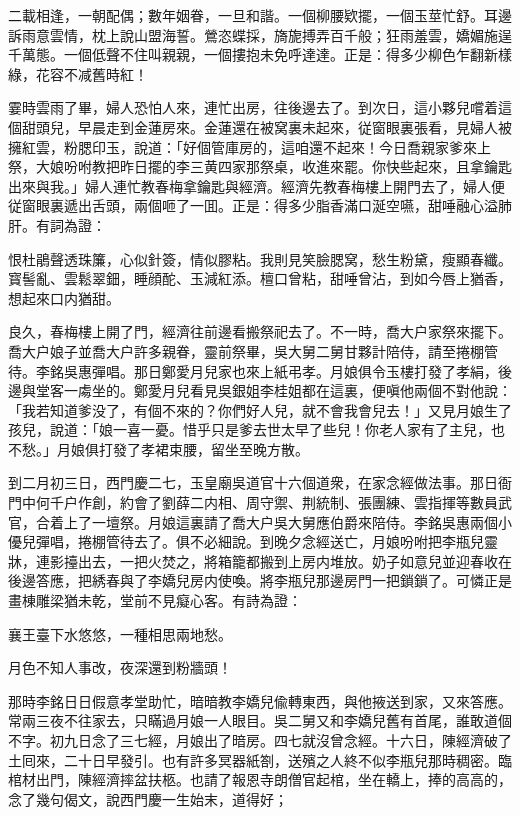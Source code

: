 \begin{myquote}
二載相逢，一朝配偶；數年姻眷，一旦和諧。一個柳腰欵擺，一個玉莖忙舒。耳邊訴雨意雲情，枕上說山盟海誓。鶯恣蝶採，旖旎搏弄百千般；狂雨羞雲，嬌媚施逞千萬態。一個低聲不住叫親親，一個摟抱未免呼達達。正是：得多少柳色乍翻新樣綠，花容不减舊時紅！
\end{myquote}

霎時雲雨了畢，婦人恐怕人來，連忙出房，往後邊去了。到次日，這小夥兒嚐着這個甜頭兒，早晨走到金蓮房來。金蓮還在被窝裏未起來，従窗眼裏張看，見婦人被擁紅雲，粉腮印玉，說道：「好個管庫房的，這咱還不起來！今日喬親家爹來上祭，大娘吩咐教把昨日擺的李三黄四家那祭桌，收進來罷。你快些起來，且拿鑰匙出來與我。」婦人連忙教春梅拿鑰匙與經濟。經濟先教春梅樓上開門去了，婦人便従窗眼裏遞出舌頭，兩個咂了一囬。正是：得多少脂香滿口涎空嚥，甜唾融心溢肺肝。有詞為證：

\begin{myquote}
恨杜鵑聲透珠簾，心似針簽，情似膠粘。我則見笑臉腮窝，愁生粉黛，瘦顯春纖。寳髻亂、雲鬆翠鈿，睡顔酡、玉減紅添。檀口曾粘，甜唾曾沾，到如今唇上猶香，想起來口内猶甜。
\end{myquote}

良久，春梅樓上開了門，經濟往前邊看搬祭祀去了。不一時，喬大户家祭來擺下。喬大户娘子並喬大户許多親眷，靈前祭畢，吳大舅二舅甘夥計陪侍，請至捲棚管待。李銘吳惠彈唱。那日鄭愛月兒家也來上紙弔孝。月娘俱令玉樓打發了孝絹，後邊與堂客一䖏坐的。鄭愛月兒看見吳銀姐李桂姐都在這裏，便嗔他兩個不對他說：「我若知道爹没了，有個不來的？你們好人兒，就不會我會兒去！」又見月娘生了孩兒，說道：「娘一喜一憂。惜乎只是爹去世太早了些兒！你老人家有了主兒，也不愁。」月娘俱打發了孝裙束腰，留坐至晚方散。

到二月初三日，西門慶二七，玉皇廟吳道官十六個道衆，在家念經做法事。那日衙門中何千户作創，約會了劉薛二内相、周守禦、荆統制、張團練、雲指揮等數員武官，合着上了一壇祭。月娘這裏請了喬大户吳大舅應伯爵來陪侍。李銘吳惠兩個小優兒彈唱，捲棚管待去了。俱不必細說。到晚夕念經送亡，月娘吩咐把李瓶兒靈牀，連影擡出去，一把火焚之，將箱籠都搬到上房内堆放。奶子如意兒並迎春收在後邊答應，把綉春與了李嬌兒房内使喚。將李瓶兒那邊房門一把鎖鎖了。可憐正是畫棟雕梁猶未乾，堂前不見癡心客。有詩為證：

\begin{myquote}
襄王臺下水悠悠，一種相思兩地愁。

月色不知人事改，夜深還到粉牆頭！
\end{myquote}

那時李銘日日假意孝堂助忙，暗暗教李嬌兒偸轉東西，與他掖送到家，又來答應。常兩三夜不往家去，只瞞過月娘一人眼目。吳二舅又和李嬌兒舊有首尾，誰敢道個不字。初九日念了三七經，月娘出了暗房。四七就沒曾念經。十六日，陳經濟破了土囘來，二十日早發引。也有許多冥器紙劄，送殯之人終不似李瓶兒那時稠密。臨棺材出門，陳經濟摔盆扶柩。也請了報恩寺朗僧官起棺，坐在轎上，捧的高高的，念了幾句偈文，說西門慶一生始末，道得好；

